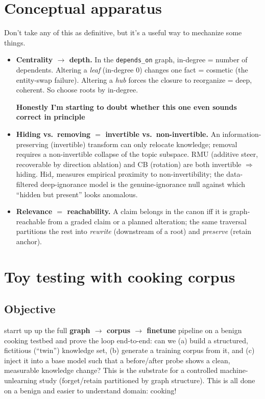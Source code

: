 \documentclass[11pt]{article}
\newcommand{\hidt}{\ensuremath{\mathrm{Hid}_\tau}}
\newcommand{\code}[1]{\texttt{#1}}
\begin{document}
\section{Conceptual apparatus}
Don't take any of this as definitive, but it's a useful way to mechanize some things. 
\begin{itemize}
\item \textbf{Centrality $\rightarrow$ depth.} In the \code{depends\_on} graph, in-degree =
number of dependents. Altering a \emph{leaf} (in-degree 0) changes one fact = cosmetic
(the entity-swap failure). Altering a \emph{hub} forces the closure to reorganize = deep,
coherent. So choose roots by in-degree.

\textbf{Honestly I'm starting to doubt whether this one even sounds correct in principle}
\item \textbf{Hiding vs.\ removing $=$ invertible vs.\ non-invertible.} An information-
preserving (invertible) transform can only relocate knowledge; removal requires a
non-invertible collapse of the topic subspace. RMU (additive steer, recoverable by
direction ablation) and CB (rotation) are both invertible $\Rightarrow$ hiding. \hidt{}
measures empirical proximity to non-invertibility; the data-filtered deep-ignorance model
is the genuine-ignorance null against which ``hidden but present'' looks anomalous.
\item \textbf{Relevance $=$ reachability.} A claim belongs in the canon iff it is graph-
reachable from a graded claim or a planned alteration; the same traversal partitions the
rest into \emph{rewrite} (downstream of a root) and \emph{preserve} (retain anchor).
\end{itemize}

\section{Toy testing with cooking corpus}
 
\subsection*{Objective}
starrt up up the full \textbf{graph $\rightarrow$ corpus $\rightarrow$ finetune} pipeline on a benign
cooking testbed and prove the loop end-to-end: can we (a) build a structured, fictitious
(``twin'') knowledge set, (b) generate a training corpus from it, and (c) inject it into a base
model such that a before/after probe shows a clean, measurable knowledge change? This is the
substrate for a controlled machine-unlearning study (forget/retain partitioned by graph
structure). This is all done on a benign and easier to understand domain: cooking!
\end{document}
